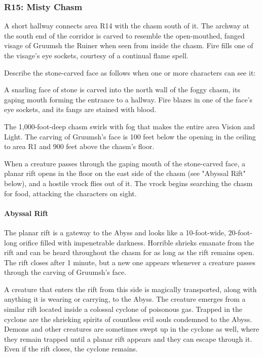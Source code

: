 \documentclass[10pt,a4paper,twoside,twocolumn,openany,nodeprecatedcode]{dndbook}
\begin{document}
\subsubsection{R15: Misty Chasm}
A short hallway connects area R14 with the chasm south of it. The archway at the south end of the corridor is carved to resemble the open-mouthed, fanged visage of Gruumsh the Ruiner when seen from inside the chasm. Fire fills one of the visage's eye sockets, courtesy of a continual flame spell.

Describe the stone-carved face as follows when one or more characters can see it:

\begin{DndReadAloud}{}
A snarling face of stone is carved into the north wall of the foggy chasm, its gaping mouth forming the entrance to a hallway. Fire blazes in one of the face's eye sockets, and its fangs are stained with blood.

\end{DndReadAloud}

The 1,000-foot-deep chasm swirls with fog that makes the entire area Vision and Light. The carving of Gruumsh's face is 100 feet below the opening in the ceiling to area R1 and 900 feet above the chasm's floor.

When a creature passes through the gaping mouth of the stone-carved face, a planar rift opens in the floor on the east side of the chasm (see "Abyssal Rift" below), and a hostile vrock flies out of it. The vrock begins searching the chasm for food, attacking the characters on sight.

\paragraph{Abyssal Rift}
The planar rift is a gateway to the Abyss and looks like a 10-foot-wide, 20-foot-long orifice filled with impenetrable darkness. Horrible shrieks emanate from the rift and can be heard throughout the chasm for as long as the rift remains open. The rift closes after 1 minute, but a new one appears whenever a creature passes through the carving of Gruumsh's face.

A creature that enters the rift from this side is magically transported, along with anything it is wearing or carrying, to the Abyss. The creature emerges from a similar rift located inside a colossal cyclone of poisonous gas. Trapped in the cyclone are the shrieking spirits of countless evil souls condemned to the Abyss. Demons and other creatures are sometimes swept up in the cyclone as well, where they remain trapped until a planar rift appears and they can escape through it. Even if the rift closes, the cyclone remains.
\end{document}
